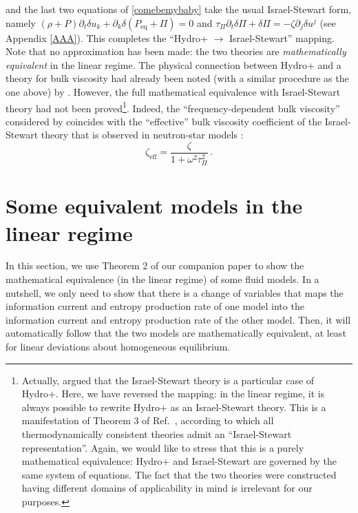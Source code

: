 \documentclass[a4paper, amsfonts, amssymb, amsmath, reprint, showkeys, nofootinbib, twoside, onecolumn,notitlepage]{revtex4-1}
\begin{document}
and the last two equations of \eqref{comebemybaby} take the usual Israel-Stewart form, namely $(\rho+P)\partial_t \delta u_k +\partial_k  \delta (P_{\text{eq}}+\Pi) =0$ and $\tau_\Pi \partial_t \delta \Pi + \delta \Pi=-\zeta \partial_j \delta u^j$ (see Appendix \ref{AAA}). This completes the  ``Hydro+ $\rightarrow$ Israel-Stewart'' mapping. Note that no approximation has been made: the two theories are \textit{mathematically equivalent} in the linear regime. The physical connection between Hydro+ and a theory for bulk viscosity had already been noted (with a similar procedure as the one above) by \cite{Hydro+2018}. However, the full mathematical equivalence with Israel-Stewart theory had not been proved\footnote{Actually, \cite{Hydro+2018} argued that the Israel-Stewart theory is a particular case of Hydro+. Here, we have reversed the mapping: in the linear regime, it is always possible to rewrite Hydro+ as an Israel-Stewart theory. This is a manifestation of Theorem 3 of Ref.\ \cite{paperI}, according to which all thermodynamically consistent theories admit an ``Israel-Stewart representation''. Again, we would like to stress that this is a purely mathematical equivalence: Hydro+ and Israel-Stewart are governed by the same system of equations. The fact that the two theories were constructed having different domains of applicability in mind is irrelevant for our purposes.}. Indeed, the ``frequency-dependent bulk viscosity'' considered by \cite{Hydro+2018} coincides with the ``effective'' bulk viscosity coefficient of the Israel-Stewart theory that is observed in neutron-star models \cite{Sawyer_Bulk1989,BulkGavassino,
AlfordBulk}:
\begin{equation}
    \zeta_{\text{eff}} = \dfrac{\zeta}{1+\omega^2 \tau^2_\Pi} \, .
\end{equation}



\section{Some equivalent models in the linear regime}\label{sec:abacadabra}

In this section, we use Theorem 2 of our companion paper \cite{paperI} to show the mathematical equivalence (in the linear regime) of some fluid models. In a nutshell, we only need to show that there is a change of variables that maps the information current and entropy production rate of one model into the information current and entropy production rate of the other model. Then, it will automatically follow that the two models are mathematically equivalent, at least for linear deviations about homogeneous equilibrium.
\end{document}
